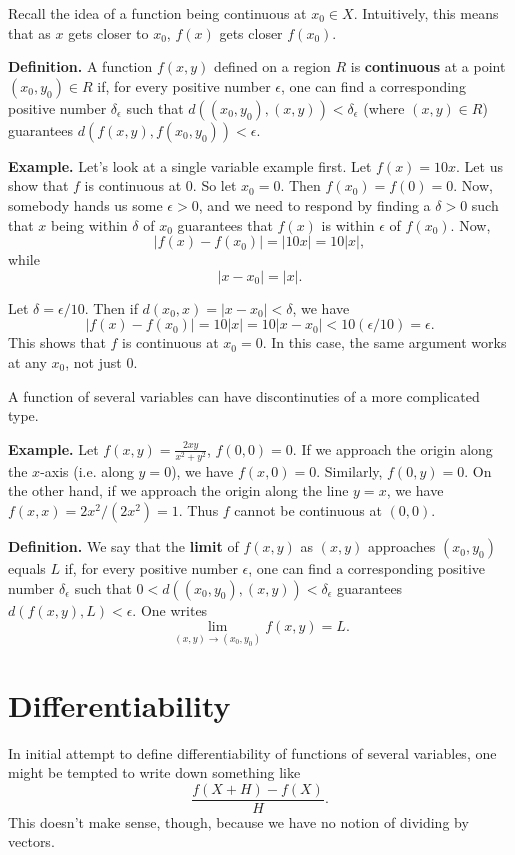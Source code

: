 \documentclass{article}
\begin{document}
Recall the idea of a function being continuous at $x_0 \in X$. Intuitively, this means that
as $x$ gets closer to $x_0$, $f(x)$ gets closer $f(x_0)$.

\textbf{Definition.} 
A function $f(x,y)$ defined on a region $R$ is \textbf{continuous} at a point $(x_0,y_0) \in R$ if, 
for every positive number $\epsilon$,  one can find a corresponding positive number $\delta_\epsilon$ such that
$d((x_0,y_0),(x,y)) < \delta_\epsilon$ (where $(x,y) \in R$) guarantees $d(f(x,y),f(x_0,y_0)) < \epsilon$. 

\textbf{Example.} 
Let's look at a single variable example first. Let $f(x) = 10x$. 
Let us show that $f$ is continuous at $0$. So let $x_0 = 0$. Then 
$f(x_0)=f(0)=0$. Now, somebody hands us some $\epsilon > 0$, and we 
need to respond by finding a $\delta > 0$ such that $x$ being within 
$\delta$ of $x_0$ guarantees that $f(x)$ is within $\epsilon$ of $f(x_0)$.
Now, 
\[|f(x)-f(x_0)| = |10x|=10|x|,\]
while
\[|x-x_0|=|x|.\]

Let $\delta = \epsilon/10$. Then if $d(x_0,x)=|x-x_0| < \delta$, we have
\[|f(x)-f(x_0)| = 10|x| = 10|x-x_0| < 10(\epsilon/10)=\epsilon.\]
This shows that $f$ is continuous at $x_0=0$. In this case, the same argument works at any $x_0$, not just $0$.

A function of several variables can have discontinuties of a more
complicated type. 

\textbf{Example.} Let $f(x,y) = \frac{2xy}{x^2+y^2}$, $f(0,0)=0$. 
If we approach the origin along the $x$-axis (i.e. along $y=0$), we have
$f(x,0)=0$. Similarly, $f(0,y)=0$. On the other hand, if we approach
the origin along the line $y=x$, we have $f(x,x) = 2x^2/(2x^2)=1$.
Thus $f$ cannot be continuous at $(0,0)$.

\textbf{Definition.} We say that the \textbf{limit} of $f(x,y)$ as $(x,y)$ approaches $(x_0,y_0)$ equals $L$ if, 
for every positive number $\epsilon$, one can find a corresponding positive number $\delta_\epsilon$ such that
$0 < d((x_0,y_0),(x,y)) < \delta_\epsilon$ guarantees $d(f(x,y),L) < \epsilon$. One writes
\[\lim_{(x,y)\to (x_0,y_0)} f(x,y) = L.\]

\section*{Differentiability}
In initial attempt to define differentiability of functions
of several variables, one might be tempted to write down something like
\[\frac{f(X+H)-f(X)}{H}.\]
This doesn't make sense, though, because we have no notion 
of dividing by vectors.
\end{document}
